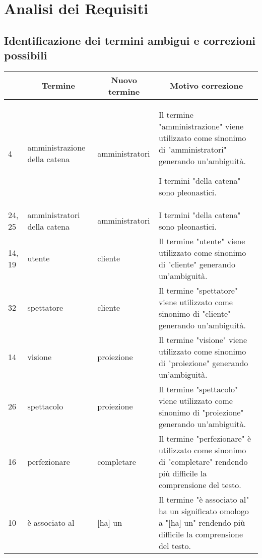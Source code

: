 \section{Analisi dei Requisiti}
%
%
\subsection*{Identificazione dei termini ambigui e correzioni possibili}
%
%
\begin{tabularx}{\linewidth}{|p{1.5cm}|p{3cm}|p{3cm}|X|}
    \hline
    \rowcolor{tblhdrcolor}
    \multicolumn{1}{|c|}{\textbf{Linea}}
     & \multicolumn{1}{|c|}{\textbf{Termine}}
     & \multicolumn{1}{|c|}{\textbf{Nuovo termine}}
     & \multicolumn{1}{|c|}{\textbf{Motivo correzione}}
    \\\hline
    4
     & amministrazione della catena
     & amministratori
     & Il termine "amministrazione" viene utilizzato come sinonimo di
    "amministratori" generando un'ambiguità.

    I termini "della catena" sono pleonastici.
    \\ \hline
    24, 25
     & amministratori della catena
     & amministratori
     & I termini "della catena" sono pleonastici.
    \\ \hline
    14, 19
     & utente
     & cliente
     & Il termine "utente" viene utilizzato come sinonimo di
    "cliente" generando un'ambiguità.
    \\ \hline
    32
     & spettatore
     & cliente
     & Il termine "spettatore" viene utilizzato come sinonimo di
    "cliente" generando un'ambiguità.
    \\ \hline
    14
     & visione
     & proiezione
     & Il termine "visione" viene utilizzato come sinonimo di
    "proiezione" generando un'ambiguità.
    \\ \hline
    26
     & spettacolo
     & proiezione
     & Il termine "spettacolo" viene utilizzato come sinonimo di
    "proiezione" generando un'ambiguità.
    \\ \hline
    16
     & perfezionare
     & completare
     & Il termine "perfezionare" è utilizzato come sinonimo di "completare"
    rendendo più difficile la comprensione del testo.
    \\ \hline
    10
     & è associato al
     & [ha] un
     & Il termine "è associato al" ha un significato omologo a
    "[ha] un" rendendo più difficile la comprensione del testo.
    \\ \hline
\end{tabularx}

